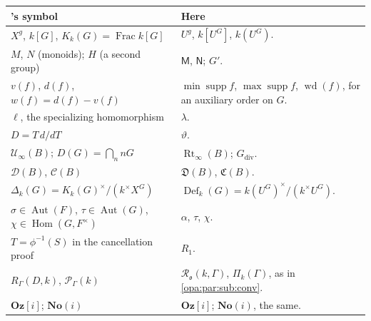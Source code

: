 \documentclass[11pt,oneside]{article}
\numberwithin{equation}{section}
\theoremstyle{definition}
\theoremstyle{remark}
\newcommand{\No}{\mathbf{No}}
\newcommand{\Oz}{\mathbf{Oz}}
\newcommand{\Og}{\mathbf{Oz}[i]}
\newcommand{\SC}{\mathbf{No}(i)}
\newcommand{\oo}{\mathfrak o}
\newcommand{\Aut}{\operatorname{Aut}}
\newcommand{\Hom}{\operatorname{Hom}}
\newcommand{\supp}{\operatorname{supp}}
\newcommand{\Frac}{\operatorname{Frac}}
\begin{document}
\begin{center}
\renewcommand{\arraystretch}{1.15}
\begin{longtable}{>{\raggedright\arraybackslash}p{}>{\raggedright\arraybackslash}p{}}
\toprule
16's symbol & Here\\
\midrule
\endhead
$X^g$, $k[G]$, $K_k(G)=\Frac k[G]$ & $U^g$, $k[U^G]$, $k(U^G)$.\\
$M$, $N$ (monoids); $H$ (a second group) & $\mathsf M$, $\mathsf N$; $G'$.\\
$v(f)$, $d(f)$, $w(f)=d(f)-v(f)$ & $\min\supp f$, $\max\supp f$, $\operatorname{wd}(f)$, for an auxiliary
order on $G$.\\
$\ell$, the specializing homomorphism & $\lambda$.\\
$D=T\,d/dT$ & $\vartheta$.\\
$\mathcal U_\infty(B)$; $D(G)=\bigcap_nnG$ & $\operatorname{Rt}_\infty(B)$; $G_{\mathrm{div}}$.\\
$\mathcal D(B)$, $\mathcal C(B)$ & $\mathfrak D(B)$, $\mathfrak C(B)$.\\
$\Delta_k(G)=K_k(G)^\times/(k^\times X^G)$ & $\operatorname{Def}_k(G)=k(U^G)^\times/(k^\times U^G)$.\\
$\sigma\in\Aut(F)$, $\tau\in\Aut(G)$, $\chi\in\Hom(G,F^\times)$ & $\alpha$, $\tau$, $\chi$.\\
$T=\phi^{-1}(S)$ in the cancellation proof & $R_1$.\\
$R_\Gamma(D,k)$, $\mathcal P_\Gamma(k)$ & $\mathcal R_\oo(k,\Gamma)$, $\Pi_k(\Gamma)$, as in
\cref{opa:par:sub:conv}.\\
$\Oz[i]$; $\No(i)$ & $\Og$; $\SC$, the same.\\
\bottomrule
\end{longtable}
\end{center}
\end{document}
